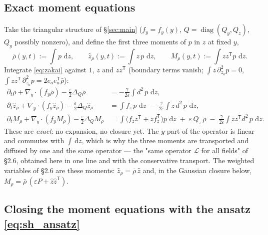 \documentclass[11pt,a4paper]{article}
\newcommand{\dd}{\,\mathrm{d}}
\newcommand{\T}{^{\mathsf T}}
\newcommand{\zh}{\hat{z}}
\newcommand{\zr}{\hat{z}_{\rho}}   %
\newcommand{\Mr}{M_{\rho}}          %
\newcommand{\eps}{\varepsilon}
\newcommand{\gy}{\nabla_{\!y}}
\theoremstyle{plain}
\theoremstyle{definition}
\theoremstyle{remark}
\begin{document}
\subsection{Exact moment equations}

Take the triangular structure of \S\ref{sec:main} ($f_y=f_y(y)$, $Q=\operatorname{diag}(Q_y,Q_z)$, $Q_y$ possibly nonzero), and define the first three moments of $p$ in $z$ at fixed $y$,
\begin{equation}
  \bar\rho(y,t) := \int p\,\dd z, \qquad \zr(y,t) := \int z\,p\,\dd z, \qquad \Mr(y,t) := \int zz\T p\,\dd z .
  \label{eq:moments}
\end{equation}
Integrate \eqref{eq:zakai} against $1$, $z$ and $zz\T$ (boundary terms vanish; $\int z\,\partial_{z_a}^2p = 0$, $\int zz\T\,\partial_{z_a}^2 p = 2e_ae_a\T\bar\rho$):
\begin{align}
  \partial_t\bar\rho + \gy\!\cdot\!(f_y\bar\rho) - \tfrac\eps2\Delta_Q\bar\rho &= -\frac{\gamma}{2\eps}\int d^2\,p\,\dd z , \label{eq:mom0}\\
  \partial_t\zr + \gy\!\cdot\!(f_y\zr) - \tfrac\eps2\Delta_Q\zr &= \int f_z\,p\,\dd z \;-\; \frac{\gamma}{2\eps}\int z\,d^2\,p\,\dd z , \label{eq:mom1}\\
  \partial_t\Mr + \gy\!\cdot\!(f_y\Mr) - \tfrac\eps2\Delta_Q\Mr &= \int\big(f_zz\T + zf_z\T\big)p\,\dd z \;+\; \eps\,Q_z\,\bar\rho \;-\; \frac{\gamma}{2\eps}\int zz\T d^2\,p\,\dd z . \label{eq:mom2}
\end{align}
These are \emph{exact}: no expansion, no closure yet. The $y$-part of the operator is linear and commutes with $\int\dd z$, which is why the three moments are transported and diffused by one and the same operator --- the "same operator $\mathcal L$ for all fields" of \S2.6, obtained here in one line and with the conservative transport. The weighted variables of \S2.6 are these moments: $\zr = \bar\rho\,\zh$ and, in the Gaussian closure below, $\Mr = \bar\rho\,(\eps P + \zh\zh\T)$.

\subsection{Closing the moment equations with the ansatz \eqref{eq:sh_ansatz}}
\end{document}
